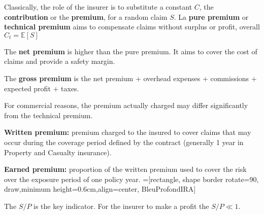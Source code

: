 \begin{f}
Classically, the role of the insurer is to substitute a constant $C$, the \textbf{contribution} or the \textbf{premium}, for a random claim $S$.
La \textbf{pure premium} or \textbf{technical premium} aims 
to compensate claims without surplus or profit, overall $C_t = \mathbb{E}[S]$
	
	The \textbf{net premium} is higher than the pure premium. It aims to cover the cost of claims and provide a safety margin.
	
	The \textbf{gross premium} is the net premium + overhead expenses + commissions + expected profit + taxes.
	
	For commercial reasons, the premium actually charged may differ significantly from the technical premium.

	\textbf{Written premium:} premium charged to the insured to cover claims that may occur during the 
coverage period defined by the contract (generally 1 year in Property and Casualty insurance).

\textbf{Earned premium:} proportion of the written premium used to cover the risk over the exposure period of 
one policy year.
=[rectangle, shape border rotate=90, draw,minimum height=0.6cm,align=center, BleuProfondIRA]

\resizebox{\linewidth}{!}
{
}
The $S/P$ is the key indicator. For the insurer to make a profit the $S/P\ll 1$.
\end{f}

